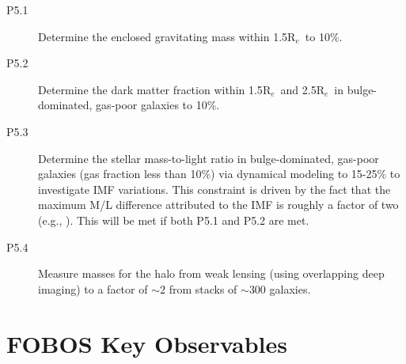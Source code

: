 \documentclass[preprint,11pt]{aastex}
\newcommand{\Reff}{{R$_{e}$}}
\begin{document}
\begin{description}


\item[P5.1] Determine the enclosed gravitating mass within 1.5\Reff\
  to
  10\%. %

\item[P5.2] Determine the dark matter fraction within 1.5\Reff\ and 2.5\Reff\ in
  bulge-dominated, gas-poor galaxies to 10\%.

\item[P5.3] Determine the stellar mass-to-light ratio in
  bulge-dominated, gas-poor galaxies (gas fraction less than 10\%) via
  dynamical modeling to 15-25\% to investigate IMF variations.  This
  constraint is driven by the fact that the maximum M/L difference
  attributed to the IMF is roughly a factor of two (e.g., \citealt{conroy2012}). This will be met if both P5.1 and P5.2 are
  met.


\item[P5.4] Measure masses for the halo from weak lensing (using overlapping deep
  imaging) to a factor of $\sim 2$ from stacks of $\sim 300$ galaxies.


\end{description}



\section{FOBOS Key Observables}\label{sec:key_observables}

\end{document}
